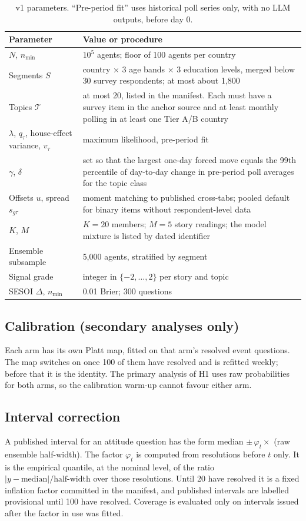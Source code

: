 \documentclass[11pt]{article}
\begin{document}
\begin{table}[h]
\centering\small
\caption{v1 parameters. ``Pre-period fit'' uses historical poll series only, with no LLM outputs, before day 0.}
\label{tab:params}
\begin{tabular}{@{}L{3.4cm}L{10.4cm}@{}}
\toprule
Parameter & Value or procedure \\
\midrule
$N$, $n_{\min}$ & $10^5$ agents; floor of 100 agents per country \\
Segments $S$ & country $\times$ 3 age bands $\times$ 3 education levels, merged below 30 survey respondents; at most about 1,800 \\
Topics $\mathcal{T}$ & at most 20, listed in the manifest. Each must have a survey item in the anchor source and at least monthly polling in at least one Tier A/B country \\
$\lambda$, $q_\tau$, house-effect variance, $v_\tau$ & maximum likelihood, pre-period fit \\
$\gamma$, $\delta$ & set so that the largest one-day forced move equals the 99th percentile of day-to-day change in pre-period poll averages for the topic class \\
Offsets $u$, spread $s_{g\tau}$ & moment matching to published cross-tabs; pooled default for binary items without respondent-level data \\
$K$, $M$ & $K=20$ members; $M=5$ story readings; the model mixture is listed by dated identifier \\
Ensemble subsample & 5,000 agents, stratified by segment \\
Signal grade & integer in $\{-2,\dots,2\}$ per story and topic \\
SESOI $\Delta$, $n_{\min}$ & 0.01 Brier; 300 questions \\
\bottomrule
\end{tabular}
\end{table}

\subsection{Calibration (secondary analyses only)}\label{app:calib}
Each arm has its own Platt map, fitted on that arm's resolved event questions. The map switches on once 100 of them have resolved and is refitted weekly; before that it is the identity. The primary analysis of H1 uses raw probabilities for both arms, so the calibration warm-up cannot favour either arm.

\subsection{Interval correction}\label{app:vc}
A published interval for an attitude question has the form median $\pm\,\varphi_t\times$ (raw ensemble half-width). The factor $\varphi_t$ is computed from resolutions before $t$ only. It is the empirical quantile, at the nominal level, of the ratio $|y-\text{median}|/\text{half-width}$ over those resolutions. Until 20 have resolved it is a fixed inflation factor committed in the manifest, and published intervals are labelled provisional until 100 have resolved. Coverage is evaluated only on intervals issued after the factor in use was fitted.



\end{document}
